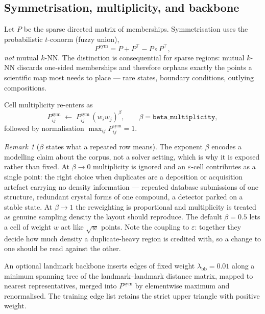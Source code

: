 \documentclass[12pt]{iopart}
\theoremstyle{definition}
\theoremstyle{plain}
\theoremstyle{remark}
\newtheorem{remark}{Remark}
\newcommand{\code}[1]{\texttt{#1}}
\begin{document}
\subsection{Symmetrisation, multiplicity, and backbone}
\label{sec:fuzzyunion}

Let $P$ be the sparse directed matrix of memberships. Symmetrisation uses the
probabilistic $t$-conorm (fuzzy union),
\begin{equation}
\label{eq:fuzzyunion}
P^{\mathrm{sym}} = P + P^\top - P\circ P^\top,
\end{equation}
\emph{not} mutual $k$-NN. The distinction is consequential for sparse regions:
mutual $k$-NN discards one-sided memberships and therefore orphans exactly the
points a scientific map most needs to place --- rare states, boundary
conditions, outlying compositions.

Cell multiplicity re-enters as
\begin{equation}
\label{eq:multiplicity}
P^{\mathrm{sym}}_{ij}\;\leftarrow\;
P^{\mathrm{sym}}_{ij}\,(w_i w_j)^{\beta},
\qquad
\beta=\code{beta\_multiplicity},
\end{equation}
followed by normalisation $\max_{ij}P^{\mathrm{sym}}_{ij}=1$.

\begin{remark}[$\beta$ states what a repeated row means]
\label{rem:beta}
The exponent $\beta$ encodes a modelling claim about the corpus, not a solver
setting, which is why it is exposed rather than fixed. At $\beta\to 0$
multiplicity is ignored and an $\varepsilon$-cell contributes as a single
point: the right choice when duplicates are a deposition or acquisition
artefact carrying no density information --- repeated database submissions of
one structure, redundant crystal forms of one compound, a detector parked on a
stable state. At $\beta\to 1$ the reweighting is proportional and multiplicity
is treated as genuine sampling density the layout should reproduce. The default
$\beta=0.5$ lets a cell of weight $w$ act like $\sqrt{w}$ points. Note the
coupling to $\varepsilon$: together they decide how much density a
duplicate-heavy region is credited with, so a change to one should be read
against the other.
\end{remark}

An optional landmark backbone inserts edges of fixed weight
$\lambda_{\mathrm{bb}}=0.01$ along a minimum spanning tree of the
landmark--landmark distance matrix, mapped to nearest representatives, merged
into $P^{\mathrm{sym}}$ by elementwise maximum and renormalised. The training
edge list retains the strict upper triangle with positive weight.
\end{document}
